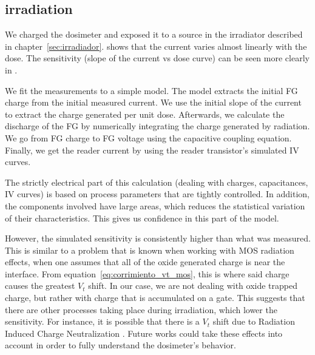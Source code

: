 \subsection{\Strontium irradiation}
We charged the dosimeter and exposed it to a 
\Strontium source
in the irradiator described in chapter~\ref{sec:irradiador}.
 shows that the current
varies almost linearly with the dose.
The sensitivity (slope of the current vs dose curve)
can be seen more clearly in
.

We fit the measurements to a simple model.
The model extracts the initial FG charge from the initial measured current.
We use the initial slope of the current to extract the charge generated per unit dose.
Afterwards, we calculate the discharge of the FG by numerically integrating the charge generated by radiation.
We go from FG charge to FG voltage using the capacitive coupling equation.
Finally, we get the reader current by using the reader transistor's simulated IV curves.

The strictly electrical part of this calculation 
(dealing with charges, capacitances, IV curves)
is based on process parameters that are tightly controlled.
In addition, the components involved have large areas, which reduces the statistical variation of their characteristics.
This gives us confidence in this part of the model.

However, the simulated sensitivity is consistently higher than what was measured.
This is similar to a problem that is known when working with MOS radiation effects,
when one assumes that all of the oxide generated charge is near the interface.
From equation~\ref{eq:corrimiento_vt_mos}, this is where said charge causes the greatest $V_t$ shift.
In our case, we are not dealing with oxide trapped charge, but rather with charge that is accumulated on a gate.
This suggests that there are other processes taking place during irradiation, which lower the sensitivity.
For instance, it is possible that there is a $V_t$ shift due to Radiation Induced Charge Neutralization
\cite{faigon_extension_2008}\cite{fleetwood_radiation-induced_1990}.
Future works could take these effects into account in order to fully understand the dosimeter's behavior.

